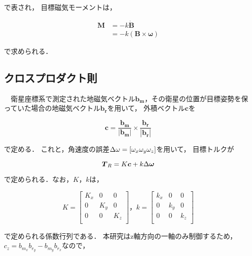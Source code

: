で表され，
目標磁気モーメントは，

\begin{equation}
    \begin{aligned}
        \boldsymbol{M} &= -k \boldsymbol{\dot{B}}\\
                       &= -k(\boldsymbol{B \times \omega})
    \end{aligned}
\end{equation}

で求められる．

\subsection{クロスプロダクト則}
　衛星座標系で測定された地磁気ベクトル$\boldsymbol{b_m}$，その衛星の位置が目標姿勢を保っていた場合の地磁気ベクトル$\boldsymbol{b_r}$を用いて，
外積ベクトル$\boldsymbol{c}$を

\begin{equation}
    \boldsymbol{c} = \boldsymbol{\frac{b_m}{|b_m|}\times\frac{b_r}{|b_r|}}
\end{equation}

で定める．
これと，角速度の誤差$\Delta\omega = [\omega_x\space\omega_y\space\omega_z]$を用いて，
目標トルクが

\begin{equation}
    \boldsymbol{T}_R = K\boldsymbol{c}+k\Delta\boldsymbol{\omega}\\
\end{equation}

で定められる．なお，$K，k$は，

\begin{equation}
    K = 
    \begin{bmatrix}
        K_x & 0 & 0 \\
        0 & K_y & 0 \\
        0 & 0 & K_z \\
    \end{bmatrix}
    ，k =
    \begin{bmatrix}
        k_x & 0 & 0 \\
        0 & k_y & 0 \\
        0 & 0 & k_z \\
    \end{bmatrix}
\end{equation}

で定められる係数行列である．
本研究はz軸方向の一軸のみ制御するため，$c_z = b_{m_x}b_{r_y} - b_{m_y}b_{r_x}$なので，

